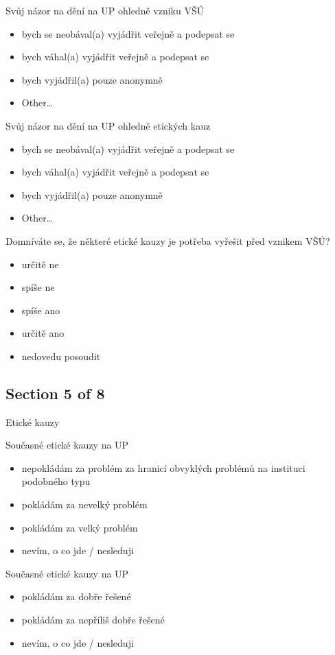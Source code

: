 Svůj názor na dění na UP ohledně vzniku VŠÚ
\begin{itemize}
      \item bych se neobával(a) vyjádřit veřejně a podepsat se
      \item bych váhal(a) vyjádřit veřejně a podepsat se
      \item bych vyjádřil(a) pouze anonymně
      \item Other…
\end{itemize}

Svůj názor na dění na UP ohledně etických kauz
\begin{itemize}
      \item bych se neobával(a) vyjádřit veřejně a podepsat se
      \item bych váhal(a) vyjádřit veřejně a podepsat se
      \item bych vyjádřil(a) pouze anonymně
      \item Other…
\end{itemize}

Domníváte se, že některé etické kauzy je potřeba vyřešit před vznikem VŠÚ?
\begin{itemize}
      \item určitě ne
      \item spíše ne
      \item spíše ano
      \item určitě ano
      \item nedovedu posoudit
\end{itemize}

\subsection{Section 5 of 8}

Etické kauzy
\bigskip

Současné etické kauzy na UP
\begin{itemize}
      \item nepokládám za problém za hranicí obvyklých problémů na instituci podobného typu
      \item pokládám za nevelký problém
      \item pokládám za velký problém
      \item nevím, o co jde / nesleduji
\end{itemize}

Současné etické kauzy na UP
\begin{itemize}
      \item pokládám za dobře řešené
      \item pokládám za nepříliš dobře řešené
      \item nevím, o co jde / nesleduji
\end{itemize}

